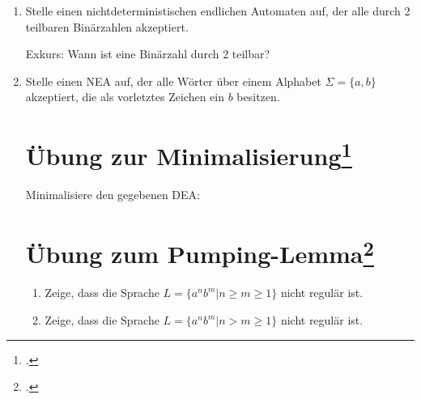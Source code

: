 \documentclass{lehramt-informatik-aufgabe}
\begin{document}
\begin{enumerate}
\item Stelle einen nichtdeterministischen endlichen Automaten auf, der
alle durch 2 teilbaren Binärzahlen akzeptiert.

Exkurs: Wann ist eine Binärzahl durch 2 teilbar?

\item Stelle einen NEA auf, der alle Wörter über einem Alphabet $\Sigma
= \{a,b\}$ akzeptiert, die als vorletztes Zeichen ein $b$ besitzen.

%

\section{Übung zur Minimalisierung\footcite[Seite 59]{theoinf:fs:1}}

Minimalisiere den gegebenen DEA:

\begin{center}
\end{center}

%

\section{Übung zum Pumping-Lemma\footcite[Seite 65]{theoinf:fs:1}}

\begin{enumerate}
\item Zeige, dass die Sprache $L = \{a^n b^m | n \geq m \geq 1\}$ nicht
regulär ist.

\item Zeige, dass die Sprache $L = \{a^n b^m | n > m \geq 1\}$ nicht
regulär ist.
\end{enumerate}

\end{enumerate}
\end{document}
